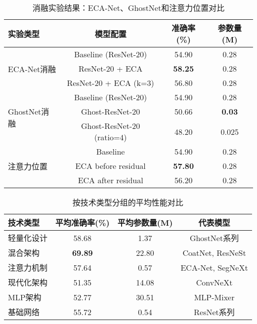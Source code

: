 \begin{table}[ht]
\centering
\caption{消融实验结果：ECA-Net、GhostNet和注意力位置对比}
\label{tab:ablation_results}
\begin{tabular}{lccc}
\toprule
\textbf{实验类型} & \textbf{模型配置} & \textbf{准确率(\%)} & \textbf{参数量(M)} \\
\midrule
\multirow{3}{*}{ECA-Net消融} 
& Baseline (ResNet-20) & 54.90 & 0.28 \\
& ResNet-20 + ECA & \textbf{58.25} & 0.28 \\
& ResNet-20 + ECA (k=3) & 56.80 & 0.28 \\
\midrule
\multirow{3}{*}{GhostNet消融} 
& Baseline (ResNet-20) & 54.90 & 0.28 \\
& Ghost-ResNet-20 & 50.66 & \textbf{0.03} \\
& Ghost-ResNet-20 (ratio=4) & 48.20 & 0.025 \\
\midrule
\multirow{3}{*}{注意力位置} 
& Baseline & 54.90 & 0.28 \\
& ECA before residual & \textbf{57.80} & 0.28 \\
& ECA after residual & 56.20 & 0.28 \\
\bottomrule
\end{tabular}
\end{table}

\begin{table}[ht]
\centering
\caption{按技术类型分组的平均性能对比}
\label{tab:tech_category_comparison}
\begin{tabular}{lccc}
\toprule
\textbf{技术类型} & \textbf{平均准确率(\%)} & \textbf{平均参数量(M)} & \textbf{代表模型} \\
\midrule
轻量化设计 & 58.68 & 1.37 & GhostNet系列 \\
混合架构 & \textbf{69.89} & 22.80 & CoatNet, ResNeSt \\
注意力机制 & 57.64 & 0.57 & ECA-Net, SegNeXt \\
现代化架构 & 51.35 & 14.08 & ConvNeXt \\
MLP架构 & 52.77 & 30.51 & MLP-Mixer \\
基础网络 & 55.72 & 0.54 & ResNet系列 \\
\bottomrule
\end{tabular}
\end{table} 
